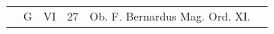 \documentclass[openany]{book}
\renewcommand{\\}{\par\hspace*{.1em}} %
\begin{document}
\begin{center}
\begin{tabular}{l | l | l | r | l l}
\color{Red}  & G & \color{Red} VI & 27 & Ob. F. Bernardus Mag. Ord. XI. & \color{Red} \\



\end{tabular}
\end{center}
\end{document}
